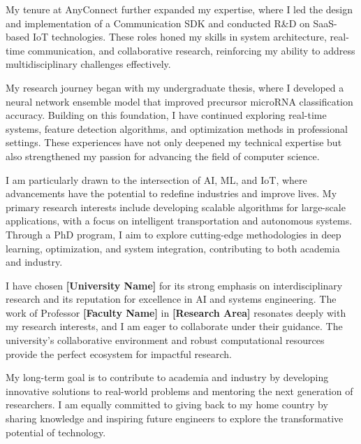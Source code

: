 \documentclass[11pt]{article}
\newif\ifshowSectionTitles
\begin{document}
My tenure at AnyConnect further expanded my expertise, where I led the design and implementation of a Communication SDK and conducted R\&D on SaaS-based IoT technologies.
These roles honed my skills in system architecture, real-time communication, and collaborative research, reinforcing my ability to address multidisciplinary challenges effectively.

\ifshowSectionTitles
\section*{Research Contributions}
\fi
My research journey began with my undergraduate thesis, where I developed a neural network ensemble model that improved precursor microRNA classification accuracy.
Building on this foundation, I have continued exploring real-time systems, feature detection algorithms, and optimization methods in professional settings.
These experiences have not only deepened my technical expertise but also strengthened my passion for advancing the field of computer science.

\ifshowSectionTitles
\section*{Research Interests}
\fi
I am particularly drawn to the intersection of AI, ML, and IoT, where advancements have the potential to redefine industries and improve lives.
My primary research interests include developing scalable algorithms for large-scale applications, with a focus on intelligent transportation and autonomous systems.
Through a PhD program, I aim to explore cutting-edge methodologies in deep learning, optimization, and system integration, contributing to both academia and industry.

\ifshowSectionTitles
\section*{Why [University Name]?}
\fi
I have chosen \textbf{[University Name]} for its strong emphasis on interdisciplinary research and its reputation for excellence in AI and systems engineering.
The work of Professor \textbf{[Faculty Name]} in \textbf{[Research Area]} resonates deeply with my research interests, and I am eager to collaborate under their guidance.
The university’s collaborative environment and robust computational resources provide the perfect ecosystem for impactful research.

\ifshowSectionTitles
\section*{Conclusion}
\fi
My long-term goal is to contribute to academia and industry by developing innovative solutions to real-world problems and mentoring the next generation of researchers.
I am equally committed to giving back to my home country by sharing knowledge and inspiring future engineers to explore the transformative potential of technology.
\end{document}
